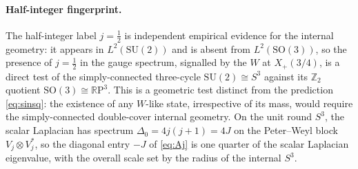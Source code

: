 \documentclass[aps,prl,twocolumn,superscriptaddress,floatfix,nofootinbib,reprint]{revtex4-2}
\newcommand{\Xp}{X_{+}}
\newcommand{\half}{\tfrac12}
\newcommand{\SU}{\mathrm{SU}}
\newcommand{\SO}{\mathrm{SO}}
\newcommand{\R}{\mathbb{R}}
\begin{document}

\paragraph{Half-integer fingerprint.}
The half-integer label $j=\half$ is independent empirical evidence for
the internal geometry: it appears in $L^{2}(\SU(2))$ and is absent
from $L^{2}(\SO(3))$, so the presence of $j=\half$ in the gauge
spectrum, signalled by the $W$ at $\Xp(3/4)$, is a direct test of the
simply-connected three-cycle $\SU(2)\cong S^{3}$ against its
$\mathbb{Z}_{2}$ quotient $\SO(3)\cong\R\mathrm{P}^{3}$.  This is a
geometric test distinct from the prediction \eqref{eq:sinsq}: the
existence of any $W$-like state, irrespective of its mass, would
require the simply-connected double-cover internal geometry.  On the
unit round $S^{3}$, the scalar Laplacian has spectrum
$\Delta_{0}=4j(j+1)=4J$ on the Peter--Weyl block
$V_{j}\otimes V_{j}^{*}$, so the diagonal entry $-J$ of \eqref{eq:Aj}
is one quarter of the scalar Laplacian eigenvalue, with the overall
scale set by the radius of the internal $S^{3}$.

\end{document}
